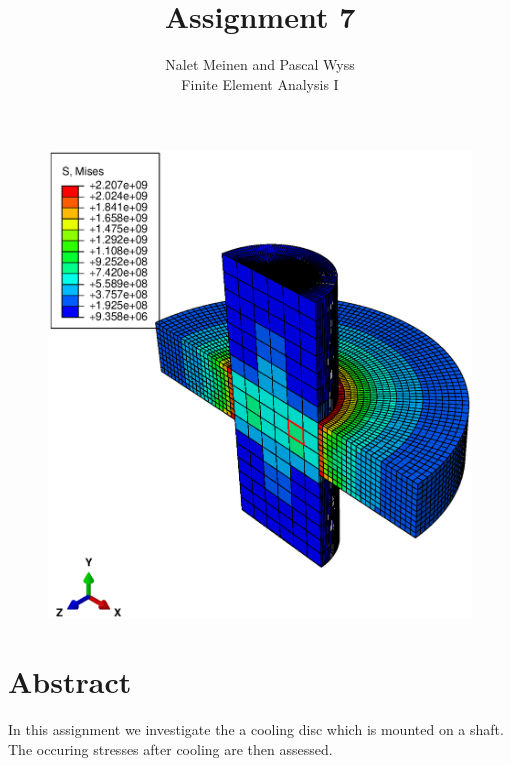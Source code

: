 \documentclass[12pt]{article}
\begin{document}


\title{Assignment 7}%
\author{Nalet Meinen and Pascal Wyss\\ %
Finite Element Analysis I
}
\maketitle

\begin{figure}[!htb]
  \centering
  \vspace*{1cm}
  \includegraphics[trim={1cm 2cm 2cm 2cm},clip,width=1.0\linewidth]{pics/stress3d}
  \label{fig:0}
\end{figure}

\newpage

\section*{Abstract}
In this assignment we investigate the a cooling disc which is mounted on a shaft.
The occuring stresses after cooling are then assessed.
\end{document}
